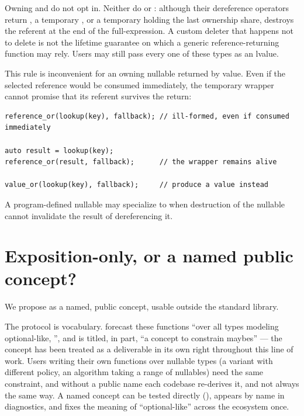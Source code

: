 \documentclass[a4paper,10pt,oneside,openany,final,article]{memoir}
\begin{document}
Owning  and  do not opt in. Neither do
 or : although their dereference operators
return , a temporary , or a temporary
 holding the last ownership share, destroys the referent at
the end of the full-expression. A custom deleter that happens not to delete is
not the lifetime guarantee on which a generic reference-returning function
may rely. Users may still pass every one of these types as an lvalue.

This rule is inconvenient for an owning nullable returned by value. Even if the selected reference would be consumed immediately, the
temporary wrapper cannot promise that its referent survives the return:

\begin{verbatim}
reference_or(lookup(key), fallback); // ill-formed, even if consumed immediately

auto result = lookup(key);
reference_or(result, fallback);      // the wrapper remains alive

value_or(lookup(key), fallback);     // produce a value instead
\end{verbatim}

A program-defined nullable may
specialize  to  when destruction
of the nullable cannot invalidate the result of dereferencing it.

\section{Exposition-only, or a named public concept?}

We propose  as a named, public concept, usable outside
the standard library.

The protocol is vocabulary.
\cite{P2988R12} forecast these functions ``over all types modeling
optional-like, '', and \cite{P1255R13} is titled,
in part, ``a concept to constrain maybes'' --- the concept has been treated
as a deliverable in its own right throughout this line of work. Users
writing their own functions over nullable types (a 
variant with different policy, an algorithm taking a range of nullables)
need the same constraint, and without a public name each codebase
re-derives it, and not always the same way. A named concept can be tested
directly (), appears by name in
diagnostics, and fixes the meaning of ``optional-like'' across the
ecosystem once.
\end{document}
